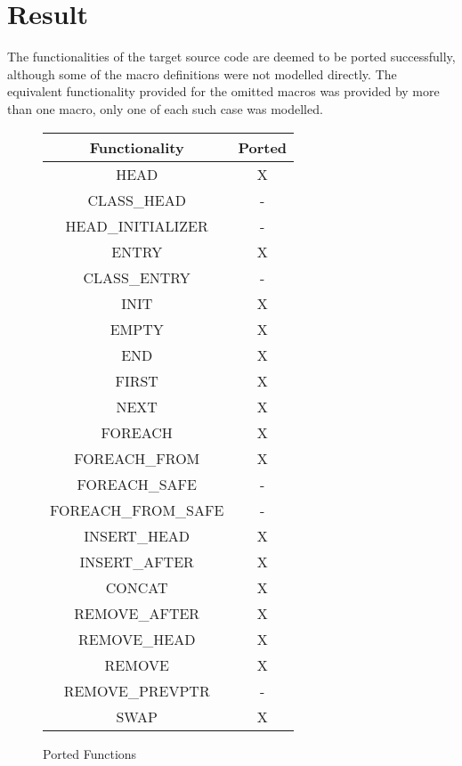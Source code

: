 \section{Result}

The functionalities of the target source code are deemed to be ported successfully, although some of the macro definitions were not modelled directly. The equivalent functionality provided for the omitted macros was provided by more than one macro, only one of each such case was modelled.

\begin{figure}[H]
 \vspace{12pt}
\begin{center}
 \begin{tabular}{||c |  c||} 
 \hline
 Functionality & Ported\\ [0.5ex] 
 \hline\hline
  HEAD & X \\ 
 \hline
 CLASS\_HEAD & -  \\
 \hline
 HEAD\_INITIALIZER & - \\ 
 \hline
 ENTRY & X  \\
 \hline
 CLASS\_ENTRY & -  \\
 \hline
 INIT & X \\
 \hline
 EMPTY & X \\  
 \hline
  END & X \\ 
 \hline
 FIRST & X  \\
 \hline
 NEXT & X  \\
 \hline
 FOREACH & X \\
 \hline
 FOREACH\_FROM & X \\ 
 \hline
  FOREACH\_SAFE & - \\ 
 \hline
 FOREACH\_FROM\_SAFE & -  \\
 \hline
 INSERT\_HEAD & X \\ 
 \hline
 INSERT\_AFTER & X  \\
 \hline
 CONCAT & X  \\
 \hline
 REMOVE\_AFTER & X \\
 \hline
 REMOVE\_HEAD & X \\ 
 \hline
  REMOVE & X \\ 
 \hline
  REMOVE\_PREVPTR & - \\
 \hline
 SWAP & X  \\
 \hline
\end{tabular}
\end{center}
    \caption{Ported Functions}
    \label{fig:portedfuncs}
\end{figure}

